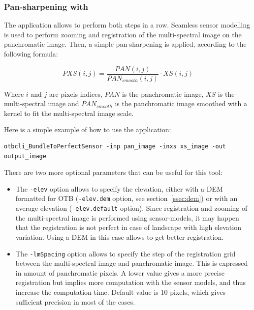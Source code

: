 \subsubsection{Pan-sharpening with \app}

The  application allows to
perform both steps in a row. Seamless sensor modelling is used to
perform zooming and registration of the multi-spectral image on the
panchromatic image. Then, a simple pan-sharpening is applied,
according to the following formula:

\begin{equation}
PXS(i,j) = \frac{PAN(i,j)}{PAN_{smooth}(i,j)} \cdot XS(i,j)
\end{equation}

Where $i$ and $j$ are pixels indices, $PAN$ is the panchromatic image,
$XS$ is the multi-spectral image and $PAN_{smooth}$ is the
panchromatic image smoothed with a kernel to fit the multi-spectral
image scale.

Here is a simple example of how to use the
 application:

\begin{verbatim}
otbcli_BundleToPerfectSensor -inp pan_image -inxs xs_image -out output_image
\end{verbatim}

There are two more optional parameters that can be useful for this
tool:
\begin{itemize}
\item The \verb?-elev? option allows to specify the elevation, either with
  a DEM formatted for OTB (\verb?-elev.dem? option, see
  section~\ref{ssec:dem}) or with an average elevation (\verb?-elev.default?
  option). Since registration
  and zooming of the multi-spectral image is performed using
  sensor-models, it may happen that the registration is not perfect in
  case of landscape with high elevation variation. Using a DEM in this
  case allows to get better registration.
\item The \verb?-lmSpacing? option allows to specify the step of the
  registration grid between the multi-spectral image and panchromatic
  image. This is expressed in amount of panchromatic pixels. A lower
  value gives a more precise registration but implies more computation
  with the sensor models, and thus increase the computation
  time. Default value is 10 pixels, which gives sufficient precision
  in most of the cases.
\end{itemize}

